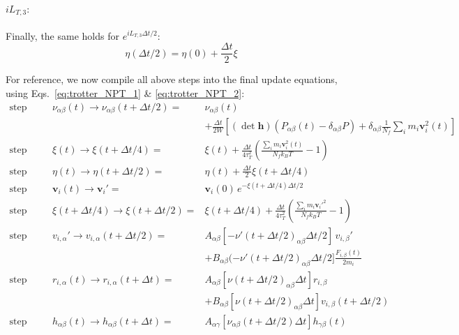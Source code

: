\documentclass[12pt,letter]{article}
\renewcommand{\vec}[1]{\mathbf{#1}}
\begin{document}
\paragraph{$i L_{T,3}:$} Finally, the same holds for $e^{i L_{T,3} \Delta t/2}$:
\begin{equation}
\eta(\Delta t/2) = \eta(0) + \frac{\Delta t}{2} \xi
\end{equation}

For reference, we now compile all above steps into the final update equations,
using Eqs.~\eqref{eq:trotter_NPT_1} \&
\eqref{eq:trotter_NPT_2}:
\begin{equation*}
\begin{aligned}
\text{step 1:}&\quad&\nu_{\alpha\beta}(t) \to \nu_{\alpha\beta}(t+\Delta t/2) =& \nu_{\alpha\beta}(t) \\
&&&+
\frac{\Delta t}{2 W} \left[(\det\vec h) \left( P_{\alpha \beta}(t) - \delta_{\alpha\beta}P\right) +
\delta_{\alpha\beta}\frac{1}{N_f} \sum_i m_i \vec v^2_i(t)\right]\\
%
\text{step 2a:}&\quad&\xi(t) \to \xi(t+\Delta t/4) =& \xi(t) + \frac{\Delta t}{4\tau_T^2} \left(\frac{\sum_i m_i \vec v^2_i(t)}{N_f k_B T} -1 \right)\\
%
\text{step 2b:}&\quad&\eta(t) \to \eta(t+\Delta t/2) =& \eta(t) + \frac{\Delta t}{2} \xi(t+\Delta t/4)\\
%
\text{step 2c:}&\quad&\vec v_i(t) \to \vec v_i' =& \vec v_i(0)\, e^{-\xi(t+\Delta t/4) \Delta t/2}\\
%
\text{step 2d:}&\quad&\xi(t+\Delta t/4) \to \xi(t+\Delta t/2) =& \xi(t+\Delta t/4) + \frac{\Delta t}{4\tau_T^2} \left(\frac{\sum_i m_i \vec v_i'^2}{N_f k_B T} -1 \right) \\
%
\text{step 3:}&\quad&v_{i,\alpha}' \to v_{i,\alpha}(t+\Delta t/2) =& A_{\alpha\beta}[-\nu'(t+\Delta t/2)_{\alpha\beta}\Delta t/2]\, v_{i,\beta}' \\
&&&+ B_{\alpha\beta}(-\nu'(t+\Delta t/2)_{\alpha\beta} \Delta t/2]\frac{  F_{i,\beta}(t)}{2 m_i}\\
%
\text{step 4:}&\quad&r_{i,\alpha}(t) \to r_{i,\alpha}(t+\Delta t) =& A_{\alpha\beta}[\nu(t+\Delta t/2)_{\alpha\beta}\Delta t] r_{i,\beta}\\
&&&+ B_{\alpha\beta}[\nu(t+\Delta t/2)_{\alpha\beta} \Delta t] v_{i,\beta}(t+\Delta t/2)\\
%
\text{step 5:}&\quad&h_{\alpha\beta}(t) \to h_{\alpha\beta}(t+\Delta t) =&
A_{\alpha\gamma}[\nu_{\alpha\beta}(t+\Delta t/2) \Delta t]  h_{\gamma\beta}(t)\\

\end{aligned}
\end{equation*}
\end{document}
